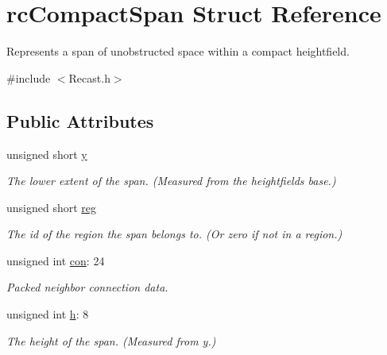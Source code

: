 \hypertarget{structrcCompactSpan}{}\section{rc\+Compact\+Span Struct Reference}
\label{structrcCompactSpan}


Represents a span of unobstructed space within a compact heightfield.  




{\ttfamily \#include $<$Recast.\+h$>$}

\subsection*{Public Attributes}
\begin{DoxyCompactItemize}
\item 
\mbox{\label{structrcCompactSpan_a51e8cdcf30408a3f84da22c4d2623b68}} 
unsigned short \hyperlink{structrcCompactSpan_a51e8cdcf30408a3f84da22c4d2623b68}{y}
\begin{DoxyCompactList}\small\item\em The lower extent of the span. (Measured from the heightfield\textquotesingle{}s base.) \end{DoxyCompactList}\item 
\mbox{\label{structrcCompactSpan_aca1a16c8453c9533120c094979601d77}} 
unsigned short \hyperlink{structrcCompactSpan_aca1a16c8453c9533120c094979601d77}{reg}
\begin{DoxyCompactList}\small\item\em The id of the region the span belongs to. (Or zero if not in a region.) \end{DoxyCompactList}\item 
\mbox{\label{structrcCompactSpan_ac01d1dafd150efc71de4ee671edb8539}} 
unsigned int \hyperlink{structrcCompactSpan_ac01d1dafd150efc71de4ee671edb8539}{con}\+: 24
\begin{DoxyCompactList}\small\item\em Packed neighbor connection data. \end{DoxyCompactList}\item 
\mbox{\label{structrcCompactSpan_a7eb3771c94cae7b6e1bc239ec8fd7043}} 
unsigned int \hyperlink{structrcCompactSpan_a7eb3771c94cae7b6e1bc239ec8fd7043}{h}\+: 8
\begin{DoxyCompactList}\small\item\em The height of the span. (Measured from \hyperlink{structrcCompactSpan_a51e8cdcf30408a3f84da22c4d2623b68}{y}.) \end{DoxyCompactList}\end{DoxyCompactItemize}


